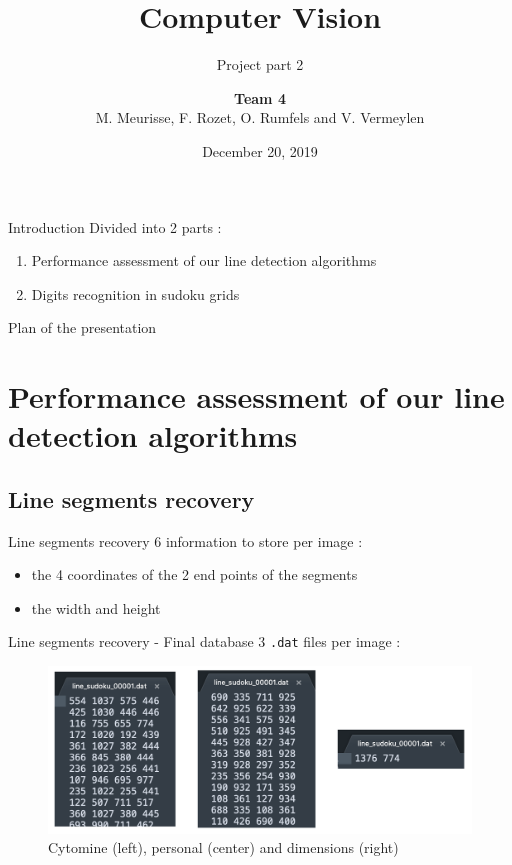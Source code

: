 \documentclass[12pt, dvipsnames]{beamer}
\title{Computer Vision}
\subtitle{Project part 2}
\author{{\bf Team 4}\\M. Meurisse, F. Rozet, O. Rumfels and V. Vermeylen}
\institute{University of Liège}
\date{December 20, 2019}
\begin{document}
\maketitle

\begin{frame}{Introduction}
    Divided into 2 parts :
    \begin{enumerate}
        \item Performance assessment of our line detection algorithms
        \item Digits recognition in sudoku grids
    \end{enumerate}
\end{frame}

\begin{frame}{Plan of the presentation}
    \tableofcontents
\end{frame}


\section{Performance assessment of our line detection algorithms}

\subsection{Line segments recovery}

\begin{frame}{Line segments recovery}
    6 information to store per image :
    \begin{itemize}
        \item the 4 coordinates of the 2 end points of the segments
        \item the width and height
    \end{itemize}
\end{frame}

\begin{frame}{Line segments recovery - Final database}
    3 \texttt{.dat} files per image :
    \begin{figure}
        \centering
        \includegraphics[width=\textwidth]{resources/png/lines-database.png}
        \caption{Cytomine (left), personal (center) and dimensions (right)}
    \end{figure}
\end{frame}
\end{document}

